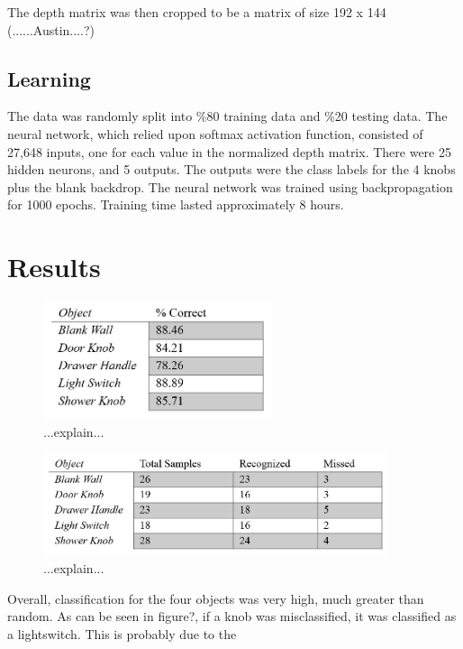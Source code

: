 \documentclass{article}
\begin{document}
The depth matrix was then cropped to be a matrix of size 192 x 144 (......Austin....?)

\subsection{Learning}
The data was randomly split into \%80 training data and \%20 testing data. The neural network, which relied upon softmax activation function, consisted of 27,648 inputs, one for each value in the normalized depth matrix.  There were 25 hidden neurons, and 5 outputs. The outputs were the class labels for the 4 knobs plus the blank backdrop.  The neural network was trained using backpropagation for 1000 epochs. Training time lasted approximately 8 hours.

\section{Results}
\begin{figure}[h!]
    \centering
    \includegraphics[width=0.6\textwidth]{Results_1.JPG}
    \caption{...explain...}
    \label{fig:results1}
\end{figure}
\begin{figure}[h!]
    \centering
    \includegraphics[width=0.9\textwidth]{Results_2.JPG}
    \caption{...explain...}
    \label{fig:results2}
\end{figure}
Overall, classification for the four objects was very high, much greater than random. As can be seen in figure?, if a knob was misclassified, it was classified as a lightswitch. This is probably due to the 
\end{document}
